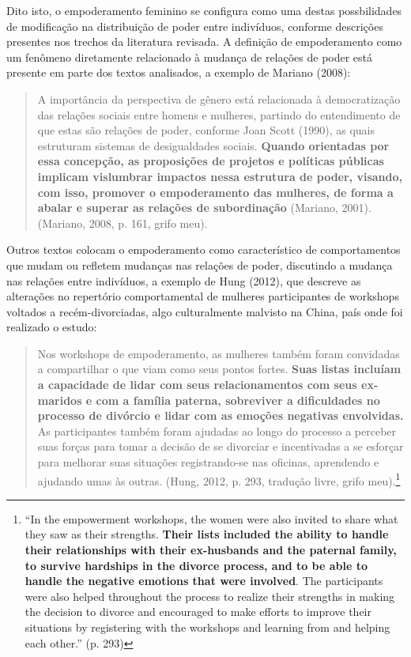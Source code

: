 Dito isto, o empoderamento feminino se configura como uma destas possbilidades de modificação na distribuição de poder entre indivíduos, conforme descrições presentes nos trechos da literatura revisada. A definição de empoderamento como um fenômeno diretamente relacionado à mudança de relações de poder está presente em parte dos textos analisados, a exemplo de Mariano (2008):

\begin{quote}
    A importância da perspectiva de gênero está relacionada à democratização das relações sociais entre homens e mulheres, partindo do entendimento de que estas são relações de poder, conforme Joan Scott (1990), as quais estruturam sistemas de desigualdades sociais. \textbf{Quando orientadas por essa concepção, as proposições de projetos e políticas públicas implicam vislumbrar impactos nessa estrutura de poder, visando, com isso, promover o empoderamento das mulheres, de forma a abalar e superar as relações de subordinação} (Mariano, 2001). (Mariano, 2008, p. 161, grifo meu).
\end{quote}

Outros textos colocam o empoderamento como característico de comportamentos que mudam ou refletem mudanças nas relações de poder, discutindo a mudança nas relações entre indivíduos, a exemplo de Hung (2012), que descreve as alterações no repertório comportamental de mulheres participantes de workshops voltados a recém-divorciadas, algo culturalmente malvisto na China, país onde foi realizado o estudo:

\begin{quote}
    Nos workshops de empoderamento, as mulheres também foram convidadas a compartilhar o que viam como seus pontos fortes. \textbf{Suas listas incluíam a capacidade de lidar com seus relacionamentos com seus ex-maridos e com a família paterna, sobreviver a dificuldades no processo de divórcio e lidar com as emoções negativas envolvidas.} As participantes também foram ajudadas ao longo do processo a perceber suas forças para tomar a decisão de se divorciar e incentivadas a se esforçar para melhorar suas situações registrando-se nas oficinas, aprendendo e ajudando umas às outras. (Hung, 2012, p. 293, tradução livre, grifo meu).\footnote{“In the empowerment workshops, the women were also invited to share what they saw as their strengths. \textbf{Their lists included the ability to handle their relationships with their ex-husbands and the paternal family, to survive hardships in the divorce process, and to be able to handle the negative emotions that were involved}. The participants were also helped throughout the process to realize their strengths in making the decision to divorce and encouraged to make efforts to improve their situations by registering with the workshops and learning from and helping each other.” (p. 293)}
\end{quote}

